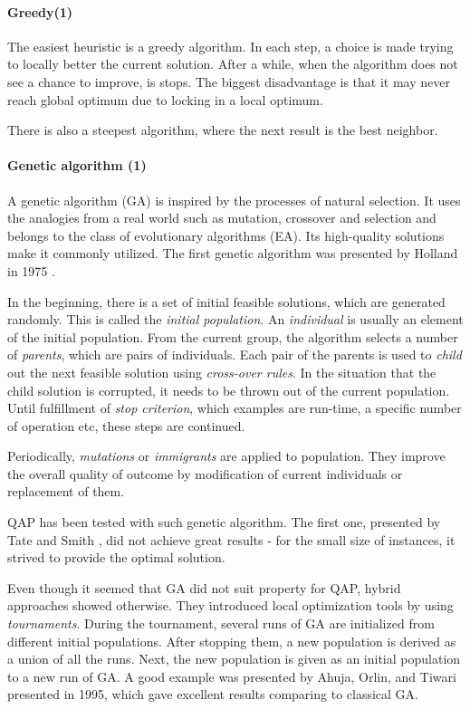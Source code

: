 \paragraph{Greedy(1)}

The easiest heuristic is a greedy algorithm.
In each step, a choice is made trying to locally better the current solution.
After a while, when the algorithm does not see a chance to improve, is stops.
The biggest disadvantage is that it may never reach global optimum due to locking in a local optimum.

There is also a steepest algorithm, where the next result is the best neighbor.


\paragraph{Genetic algorithm (1)}

A genetic algorithm (GA) is inspired by the processes of natural selection.
It uses the analogies from a real world such as mutation, crossover and selection and belongs to the class of evolutionary algorithms (EA).
Its high-quality solutions make it commonly utilized.
The first genetic algorithm was presented by Holland in 1975 \cite{holland1975adaptation}.

In the beginning, there is a set of initial feasible solutions, which are generated randomly.
This is called the \textit{initial population}.
An \textit{individual} is usually an element of the initial population.
From the current group, the algorithm selects a number of \textit{parents}, which are pairs of individuals.
Each pair of the parents is used to \textit{child} out the next feasible solution using \textit{cross-over rules}.
In the situation that the child solution is corrupted, it needs to be thrown out of the current population.
Until fulfillment of \textit{stop criterion}, which examples are run-time, a specific number of operation etc, these steps are continued.

Periodically, \textit{mutations} or \textit{immigrants} are applied to population.
They improve the overall quality of outcome by modification of current individuals or replacement of them.

QAP has been tested with such genetic algorithm.
The first one, presented by Tate and Smith \cite{tate1995genetic}, did not achieve great results - for the small size of instances, it strived to provide the optimal solution.

Even though it seemed that GA did not suit property for QAP, hybrid approaches showed otherwise.
They introduced local optimization tools by using \textit{tournaments}.
During the tournament, several runs of GA are initialized from different initial populations.
After stopping them, a new population is derived as a union of all the runs.
Next, the new population is given as an initial population to a new run of GA.
A good example was presented by Ahuja, Orlin, and Tiwari \cite{ahuja2000greedy} presented in 1995, which gave excellent results comparing to classical GA.

